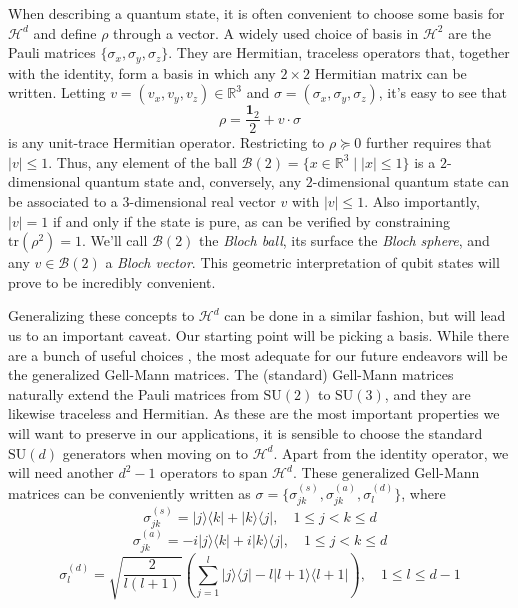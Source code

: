 		When describing a quantum state, it is often convenient to choose some basis for $\mathcal{H}^d$ and define $\rho$ through a vector. A widely used choice of basis in $\mathcal{H}^2$ are the Pauli matrices $\{\sigma_x, \sigma_y, \sigma_z\}$. They are Hermitian, traceless operators that, together with the identity, form a basis in which any $2 \times 2$ Hermitian matrix can be written. Letting $v = (v_x, v_y, v_z) \in \mathbb{R}^3$ and $\sigma = (\sigma_x, \sigma_y, \sigma_z)$, it's easy to see that
		$$
			\rho = \frac{\mathbf{1}_2}{2} + v \cdot \sigma
		$$
		is any unit-trace Hermitian operator. Restricting to $\rho \succeq 0$ further requires that $\lvert v \rvert \leq 1$. Thus, any element of the ball $\mathcal{B}(2) = \{ x \in \mathbb{R}^3 \mid \lvert x \vert \leq 1 \}$ is a $2$-dimensional quantum state and, conversely, any $2$-dimensional quantum state can be associated to a $3$-dimensional real vector $v$ with $\lvert v \rvert \leq 1$. Also importantly, $\lvert v \rvert = 1$ if and only if the state is pure, as can be verified by constraining $\text{tr}(\rho^2) = 1$. We'll call $\mathcal{B}(2)$ the \emph{Bloch ball}, its surface the \emph{Bloch sphere}, and any $v \in \mathcal{B}(2)$ a \emph{Bloch vector}. This geometric interpretation of qubit states will prove to be incredibly convenient.

		Generalizing these concepts to $\mathcal{H}^d$ can be done in a similar fashion, but will lead us to an important caveat. Our starting point will be picking a basis. While there are a bunch of useful choices \cite{bertlmann_2008_bloch}, the most adequate for our future endeavors will be the generalized Gell-Mann matrices. The (standard) Gell-Mann matrices naturally extend the Pauli matrices from $\text{SU}(2)$ to $\text{SU}(3)$, and they are likewise traceless and Hermitian. As these are the most important properties we will want to preserve in our applications, it is sensible to choose the standard $\text{SU}(d)$ generators when moving on to $\mathcal{H}^d$. Apart from the identity operator, we will need another $d^2 - 1$ operators to span $\mathcal{H}^d$. These generalized Gell-Mann matrices can be conveniently written as $\sigma = \{ \sigma^{(s)}_{jk}, \sigma^{(a)}_{jk}, \sigma^{(d)}_l \}$, where
		$$
			\sigma^{(s)}_{jk} = \lvert j \rangle \langle k \rvert + \lvert k \rangle \langle j \rvert, \quad 1 \leq j < k \leq d
		$$
		$$
			\sigma^{(a)}_{jk} = -i\lvert j \rangle \langle k \rvert + i\lvert k \rangle \langle j \rvert, \quad 1 \leq j < k \leq d
		$$
		$$
			\sigma^{(d)}_{l} = \sqrt{\frac{2}{l (l+1)}} \left( \sum_{j=1}^l \lvert j \rangle \langle j \rvert - l\lvert l + 1 \rangle \langle l + 1 \rvert \right), \quad 1 \leq l \leq d - 1
		$$

